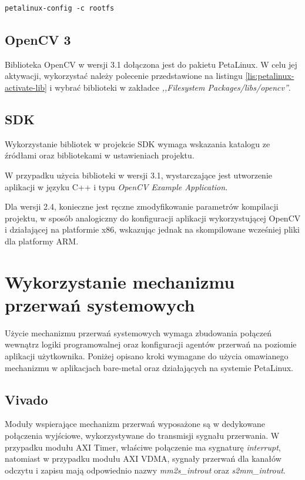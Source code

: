 {\begin{lstlisting}[caption=Dołączenie biblioteki do projektu PetaLinux., label=lis:petalinux-activate-lib]
petalinux-config -c rootfs
\end{lstlisting}


\subsection{OpenCV 3}
Biblioteka OpenCV w wersji 3.1 dołączona jest do pakietu PetaLinux. W celu jej aktywacji, wykorzystać należy polecenie przedstawione na listingu \ref{lis:petalinux-activate-lib} i wybrać biblioteki w zakładce \emph{,,Filesystem Packages/libs/opencv''}.

\subsection{SDK}
Wykorzystanie bibliotek w projekcie SDK wymaga wskazania katalogu ze źródłami oraz bibliotekami w ustawieniach projektu.

W przypadku użycia biblioteki w wersji 3.1, wystarczające jest utworzenie aplikacji w języku C++ i typu \textit{OpenCV Example Application}.

Dla wersji 2.4, konieczne jest ręczne zmodyfikowanie parametrów kompilacji projektu, w sposób analogiczny do konfiguracji aplikacji wykorzystującej OpenCV i działającej na platformie x86, wskazując jednak na skompilowane wcześniej pliki dla platformy ARM.
\section{Wykorzystanie mechanizmu przerwań systemowych}
\label{sec:interrupts-config}
Użycie mechanizmu przerwań systemowych wymaga zbudowania połączeń wewnątrz logiki programowalnej oraz konfiguracji agentów przerwań na poziomie aplikacji użytkownika. Poniżej opisano kroki wymagane do użycia omawianego mechanizmu w aplikacjach bare-metal oraz działających na systemie PetaLinux.

\subsection{Vivado}
Moduły wspierające mechanizm przerwań wyposażone są w dedykowane połączenia wyjściowe, wykorzystywane do transmisji sygnału przerwania. W przypadku modułu AXI Timer, właściwe połączenie ma sygnaturę \emph{interrupt}, natomiast w przypadku modułu AXI VDMA, sygnały przerwań dla kanałów odczytu i zapisu mają odpowiednio nazwy \emph{mm2s\_introut} oraz \emph{s2mm\_introut}.

}
